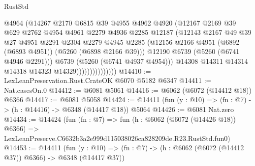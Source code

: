 \begin{lexlean}{RustStd}
\begin{coremodule}
                                @4964
                                (@14267
                                  @2170
                                  @6815
                                  @39
                                  @4955
                                  @4962
                                  @4920
                                  (@12167
                                    @2169
                                    @39
                                    @629
                                    @2762
                                    @4954
                                    @4961
                                    @2279
                                    @4936
                                    @2285
                                    @12187
                                    (@12143
                                      @2167
                                      @49
                                      @39
                                      @27
                                      @4951
                                      @2291
                                      @2304
                                      @2279
                                      @4945
                                      @2285
                                      (@12156
                                        @2166
                                        @4951
                                        (@6892 (@6893 @4951))
                                        (@5260 (@6898 @2166 @39)))
                                      @12190
                                      @6739
                                      (@5260 (@6741 @4946 @2291)))
                                    @6739
                                    (@5260 (@6741 @4937 @4954)))
                                  @14308
                                  @14311
                                  @14314
                                  @14318
                                  @14323
                                  @14329)))))))))))))))
@14410 := LexLeanPreservation.Rust.CrateOK @6070 @5182 @6347
@14411 := Nat.casesOn.{0}
@14412 := @6081 @5061
@14416 := @6062 (@6072 (@14412 @18)) @6366
@14417 := @6081 @5058
@14424 := @14411 (fun (y : @10) => (fn : @7) -> (h : @14416) -> @6348 (@14417 @18)) @5064
@14426 := @6081 Nat.zero
@14434 := @14424
    (fun (fn : @7) =>
    fun (h : @6062 (@6072 (@14426 @18)) @6366) =>
    LexLeanPreserve.C6632b3a2e999d115038026ca828209de.R23.RustStd.fun0)
@14453 := @14411
    (fun (y : @10) => (fn : @7) -> (h : @6062 (@6072 (@14412 @37)) @6366) -> @6348 (@14417 @37))

\end{coremodule}
\end{lexlean}
